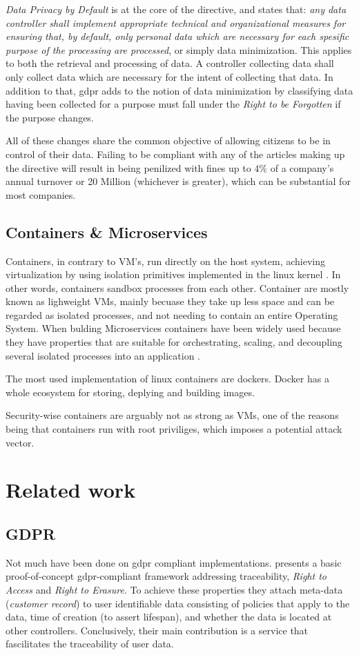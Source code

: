 \documentclass[USenglish]{uit-thesis}
\begin{document}
\textit{Data Privacy by Default} is at the core of the directive, and states
that: \textit{any data controller shall implement appropriate technical and organizational
measures for ensuring that, by default, only personal data which are necessary for each spesific
purpose of the processing are processed}, or simply data minimization.
This applies to both the retrieval and processing of data.
A controller collecting data shall only collect data which are necessary for the intent
of collecting that data.
In addition to that, \gls{gdpr} adds to the notion of data minimization by classifying
data having been collected for a purpose must fall under the \textit{Right to be Forgotten}
if the purpose changes.

All of these changes share the common objective of allowing citizens to
be in control of their data.
Failing to be compliant with any of the articles making up the
directive will result in being penilized with fines up to $ 4\% $ of a company's annual turnover
or 20 Million (whichever is greater), which can be substantial for most companies.
\section{Containers \& Microservices}
Containers, in contrary to VM's, run directly on the host system, achieving virtualization
by using isolation primitives implemented in the linux kernel \cite{Soltesz:2007:COS:1272998.1273025, 7095802}.
In other words, containers sandbox processes from each other.
Container are mostly known as lighweight VMs, mainly becuase they take up less space
and can be regarded as isolated processes, and not needing to contain an entire Operating System.
When bulding Microservices containers have been widely used because they have properties
that are suitable for orchestrating, scaling, and decoupling several isolated processes into an application \cite{micro1}.

The most used implementation of linux containers are dockers.
Docker has a whole ecosystem for storing, deplying and building images.

Security-wise containers are arguably not as strong as VMs, one of the reasons being
that containers run with root priviliges, which imposes a potential attack vector.


\chapter{Related work}
\section{GDPR}
Not much have been done on \gls{gdpr} compliant implementations.
\cite{danishguy} presents a basic proof-of-concept \gls{gdpr}-compliant framework addressing
traceability, \textit{Right to Access} and \textit{Right to Erasure}.
To achieve these properties they attach meta-data (\textit{customer record}) to user identifiable data consisting of
policies that apply to the data, time of creation (to assert lifespan), and
whether the data is located at other controllers.
Conclusively, their main contribution is a service that fascilitates
the traceability of user data.
\end{document}
